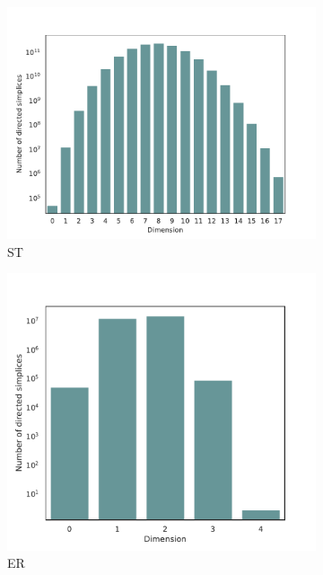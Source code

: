 \begin{figure}[ht]
  \centering
  \begin{subfigure}{.49 \linewidth}
    \includegraphics[scale=0.49]{./counts/real50k_count.pdf}
    \caption{ST}
  \end{subfigure}%
  \begin{subfigure}{.49 \linewidth}
    \includegraphics[scale=0.405]{./counts/random50k.pdf}
    \caption{ER}
  \end{subfigure}
  \begin{subfigure}{.45 \linewidth}

\end{subfigure}
\end{figure}
